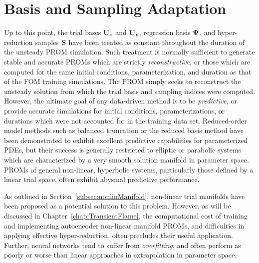 \section{Basis and Sampling Adaptation}\label{sec:adaptation}

Up to this point, the trial bases $\consTrial$ and $\primTrial$, regression basis $\deimBasis$, and hyper-reduction samples $\mathbf{S}$ have been treated as constant throughout the duration of the unsteady PROM simulation. Such treatment is normally sufficient to generate stable and accurate PROMs which are strictly \textit{reconstructive}, or those which are computed for the same initial conditions, parameterization, and duration as that of the FOM training simulations. The PROM simply seeks to reconstruct the unsteady solution from which the trial basis and sampling indices were computed. However, the ultimate goal of any data-driven method is to be \textit{predictive}, or provide accurate simulations for initial conditions, parameterizations, or durations which were not accounted for in the training data set. Reduced-order model methods such as balanced truncation or the reduced basis method have been demonstrated to exhibit excellent predictive capabilities for parameterized PDEs, but their success is generally restricted to elliptic or parabolic systems which are characterized by a very smooth solution manifold in parameter space. PROMs of general non-linear, hyperbolic systems, particularly those defined by a linear trial space, often exhibit abysmal predictive performance.

As outlined in Section~\ref{subsec:nonlinManifold}, non-linear trial manifolds have been proposed as a potential solution to this problem. However, as will be discussed in Chapter~\ref{chap:TransientFlame}, the computational cost of training and implementing autoencoder non-linear manifold PROMs, and difficulties in applying effective hyper-reduction, often precludes their useful application. Further, neural networks tend to suffer from \textit{overfitting}, and often perform as poorly or worse than linear approaches in extrapolation in parameter space.

